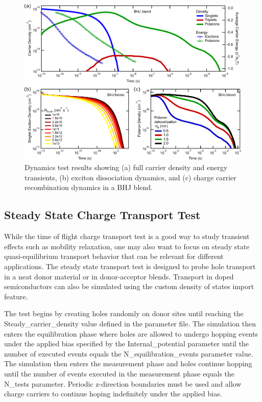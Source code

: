 \documentclass[%
 reprint,onecolumn,notitlepage,
superscriptaddress,longbibliography,
 amsmath,amssymb,
 aps,rmp,floatfix,
]{revtex4-1}
\begin{document}
\begin{figure}[h]
    \centering
    \includegraphics{Dynamics_example_data.pdf}
    \caption{Dynamics test results showing (a) full carrier density and energy transients, (b) exciton dissociation dynamics, and (c) charge carrier recombination dynamics in a BHJ blend.}
    \label{fig:dynamics_example}
\end{figure}

\subsection{Steady State Charge Transport Test}

While the time of flight charge transport test is a good way to study transient effects such as mobility relaxation, one may also want to focus on steady state quasi-equilibrium transport behavior that can be relevant for different applications.
The steady state transport test is designed to probe hole transport in a neat donor material or in donor-acceptor blends.
Transport in doped semiconductors can also be simulated using the custom density of states import feature.

The test begins by creating holes randomly on donor sites until reaching the Steady\_carrier\_density value defined in the parameter file.
The simulation then enters the equilibration phase where holes are allowed to undergo hopping events under the applied bias specified by the Internal\_potential parameter until the number of executed events equals the N\_equilibration\_events parameter value.
The simulation then enters the measurement phase and holes continue hopping until the number of events executed in the measurement phase equals the N\_tests parameter.
Periodic z-direction boundaries must be used and allow charge carriers to continue hoping indefinitely under the applied bias.
\end{document}
